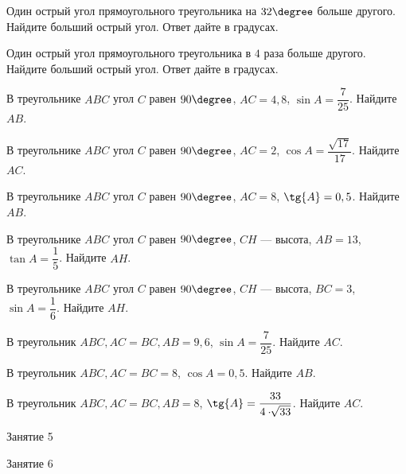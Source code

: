 \begin{class}[number=4]
	\begin{listofex}
		\item Один острый угол прямоугольного треугольника на \( 32\degree \) больше другого. Найдите больший острый угол. Ответ дайте в градусах.
		\item Один острый угол прямоугольного треугольника в \( 4 \) раза больше другого. Найдите больший острый угол. Ответ дайте в градусах.
		\item В треугольнике \(ABC\) угол \(C\) равен \(90 \degree \), \(AC=4,8\), \(\sin{A} = \dfrac{7}{25}\). Найдите \(AB\).
		\item В треугольнике \(ABC\) угол \(C\) равен \(90 \degree \), \(AC=2\), \(\cos{A} = \dfrac{\sqrt{17}}{17}\). Найдите \(AC\).
		\item В треугольнике \(ABC\) угол \(C\) равен \(90 \degree \), \(AC=8\), \(\tg{A} = 0,5\). Найдите \(AB\).
		\item В треугольнике \(ABC\) угол \(C\) равен \(90 \degree \), \(CH\) --- высота, \(AB=13\), \(\tan{A} = \dfrac{1}{5}\). Найдите \(AH\).
		\item В треугольнике \(ABC\) угол \(C\) равен \(90 \degree \), \(CH\) --- высота, \(BC=3\), \(\sin{A} = \dfrac{1}{6}\). Найдите \(AH\).
		\item В треугольник \(ABC, AC = BC, AB = 9,6\), \( \sin{A}= \dfrac{7}{25} \). Найдите \(AC\).
		\item В треугольник \(ABC, AC = BC = 8\), \( \cos{A}= 0,5 \). Найдите \(AB\).
		\item В треугольник \(ABC, AC = BC, AB = 8\), \( \tg{A}= \dfrac{33}{4 \cdot \sqrt[]{33}} \). Найдите \(AC\).
	\end{listofex}
\end{class}

\begin{class}[number=5]
	\begin{listofex}
		\item Занятие 5
	\end{listofex}
\end{class}

\begin{class}[number=6]
	\begin{listofex}
		\item Занятие 6
	\end{listofex}
\end{class}

